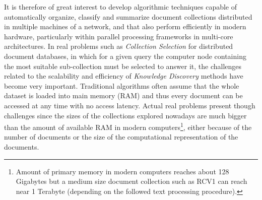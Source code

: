 \documentclass[10pt]{article}
\begin{document}
It is therefore of great interest to develop algorithmic techniques capable of automatically organize, classify and summarize document collections distributed in multiple machines of a network, and that also perform efficiently in modern hardware, particularly within parallel processing frameworks in multi-core architectures. In real problems such as \textit{Collection Selection} for distributed document databases, in which for a given query the computer node containing the most suitable
sub-collection must be selected to answer it,
the challenges related to the scalability and efficiency of \textit{Knowledge Discovery} methods have become very important. Traditional algorithms often assume that the whole dataset is loaded into main memory (RAM) and thus every document can be accessed at any time with no access latency. Actual real problems present though challenges since the sizes of the collections explored nowadays are much bigger than the amount of available RAM in modern computers\footnote{Amount of primary memory in modern computers reaches about 128 Gigabytes but a medium size document collection such as RCV1 can reach near 1 Terabyte (depending on the followed text processing procedure).}, either because of the number of documents or the size of the computational representation of the documents.
\end{document}
